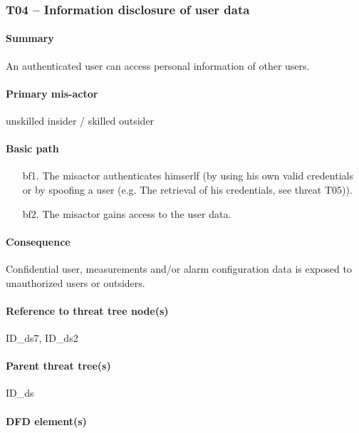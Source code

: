 \subsubsection{T04 -- Information disclosure of user data}

\paragraph{Summary}

\npar An authenticated user can access personal information of other users.

\paragraph{Primary mis-actor}

\npar unskilled insider / skilled outsider

\paragraph{Basic path}

\begin{enumerate}
	\item[bf1.] The misactor authenticates himserlf (by using his own valid
	credentials or by spoofing a user (e.g. The retrieval of his credentials, see
	threat T05)).
    \item[bf2.] The misactor gains access to the user data.
\end{enumerate}

\paragraph{Consequence}

\npar Confidential user, measurements and/or alarm configuration data is exposed
to unauthorized users or outsiders.

\paragraph{Reference to threat tree node(s)}

ID\_ds7, ID\_ds2

\paragraph{Parent threat tree(s)}

ID\_ds

\paragraph{DFD element(s)}

